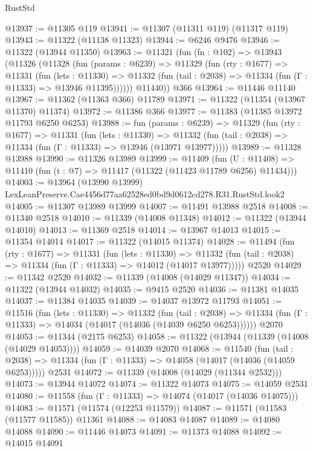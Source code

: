 \begin{lexlean}{RustStd}
\begin{coremodule}
@13937 := @11305 @119
@13941 := @11307 (@11311 @119) (@11317 @119)
@13943 := @11322 (@11138 @11323)
@13944 := @6246 @9476
@13946 := @11322 (@13944 @11350)
@13963 := @11321
    (fun (fn : @102) =>
    @13943
      (@11326
        (@11328
          (fun (params : @6239) =>
          @11329
            (fun (rty : @1677) =>
            @11331
              (fun (lets : @11330) =>
              @11332 (fun (tail : @2038) => @11334 (fun (Γ : @11333) => @13946 @11395))))))
        @11440))
    @366
@13964 := @11446 @11140
@13967 := @11362 (@11363 @366) @11789
@13971 := @11322 (@11354 (@13967 @11370) @11374)
@13972 := @11386 @366
@13977 := @11383 (@11385 @13972 @11793 @6250 @6253)
@13988 := fun (params : @6239) =>
  @11329
    (fun (rty : @1677) =>
    @11331
      (fun (lets : @11330) =>
      @11332 (fun (tail : @2038) => @11334 (fun (Γ : @11333) => @13946 (@13971 @13977)))))
@13989 := @11328 @13988
@13990 := @11326 @13989
@13999 := @11409
    (fun (U : @11408) => @11410 (fun (t : @7) => @11417 (@11322 (@11423 @11789 @6256) @11434)))
@14003 := @13964 (@13990 @13999) LexLeanPreserve.Cae4456d77aa62528ed0bd9d0612cd278.R31.RustStd.look2
@14005 := @11307 @13989 @13999
@14007 := @11491 @13988 @2518
@14008 := @11340 @2518
@14010 := @11339 (@14008 @11348)
@14012 := @11322 (@13944 @14010)
@14013 := @11369 @2518
@14014 := @13967 @14013
@14015 := @11354 @14014
@14017 := @11322 (@14015 @11374)
@14028 := @11494
    (fun (rty : @1677) =>
    @11331
      (fun (lets : @11330) =>
      @11332 (fun (tail : @2038) => @11334 (fun (Γ : @11333) => @14012 (@14017 @13977)))))
    @2520
@14029 := @11342 @2520
@14032 := @11339 (@14008 (@14029 @11347))
@14034 := @11322 (@13944 @14032)
@14035 := @9415 @2520
@14036 := @11381 @14035
@14037 := @11384 @14035
@14039 := @14037 @13972 @11793
@14051 := @11516
    (fun (lets : @11330) =>
    @11332
      (fun (tail : @2038) =>
      @11334 (fun (Γ : @11333) => @14034 (@14017 (@14036 (@14039 @6250 @6253))))))
    @2070
@14053 := @11344 (@2175 @6253)
@14058 := @11322 (@13944 (@11339 (@14008 (@14029 @14053))))
@14059 := @14039 @2070
@14068 := @11540
    (fun (tail : @2038) => @11334 (fun (Γ : @11333) => @14058 (@14017 (@14036 (@14059 @6253)))))
    @2531
@14072 := @11339 (@14008 (@14029 (@11344 @2532)))
@14073 := @13944 @14072
@14074 := @11322 @14073
@14075 := @14059 @2531
@14080 := @11558 (fun (Γ : @11333) => @14074 (@14017 (@14036 @14075)))
@14083 := @11571 (@11574 (@12253 @11579))
@14087 := @11571 (@11583 (@11577 @11585)) @11361
@14088 := @14083 @14087
@14089 := @14080 @14088
@14090 := @11446 @14073
@14091 := @11373 @14088
@14092 := @14015 @14091

\end{coremodule}
\end{lexlean}
